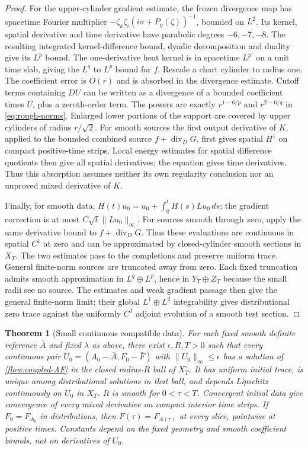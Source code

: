 \documentclass[11pt]{article}
\numberwithin{equation}{section}
\newtheorem{theorem}{Theorem}[section]
\theoremstyle{definition}
\theoremstyle{remark}
\begin{document}
\begin{proof}
For the upper-cylinder gradient estimate, the frozen divergence
map has spacetime Fourier multiplier
$-\zeta_k\zeta_i(i\sigma+P_y(\zeta))^{-1}$, bounded on $L^2$.
Its kernel, spatial derivative and time derivative have parabolic
degrees $-6,-7,-8$. The resulting integrated kernel-difference
bound, dyadic decomposition and duality give its $L^p$ bound.
The one-derivative heat kernel is in spacetime $L^{p'}$
on a unit time slab, giving the $L^q$ to $L^p$ bound for $f$.
Rescale a chart cylinder to radius one. The coefficient error
is $O(r)$ and is absorbed in the divergence estimate.
Cutoff terms containing $DU$ can be written as a divergence
of a bounded coefficient times $U$, plus a zeroth-order term.
The powers are exactly $r^{1-6/p}$ and $r^{2-6/q}$ in
\eqref{eq:rough-norms}. Enlarged lower portions of the support
are covered by upper cylinders of radius $r/\sqrt2$.
For smooth sources the first output derivative of $K$, applied
to the bounded combined source $f+\operatorname{div}_DG$,
first gives spatial $H^1$ on compact positive-time strips.
Local energy estimates for spatial difference quotients then
give all spatial derivatives; the equation gives time derivatives.
Thus this absorption assumes neither its own regularity
conclusion nor an unproved mixed derivative of $K$.

Finally, for smooth data,
$H(t)u_0=u_0+\int_0^tH(s)Lu_0\,ds$; the gradient correction
is at most $C\sqrt t\|Lu_0\|_\infty$.
For sources smooth through zero, apply the same derivative
bound to $f+\operatorname{div}_DG$. Thus these evaluations
are continuous in spatial $C^1$ at zero and can be approximated
by closed-cylinder smooth sections in $X_T$.
The two estimates pass to the completions and preserve uniform
trace. General finite-norm sources are truncated away from zero.
Each fixed truncation admits smooth approximation in
$L^q\oplus L^p$, hence in $Y_T\oplus Z_T$ because the small
radii see no source. The estimates and weak gradient passage
then give the general finite-norm limit;
their global $L^1\oplus L^2$ integrability gives distributional
zero trace against the uniformly $C^1$ adjoint evolution of a
smooth test section.
\end{proof}

\begin{theorem}[Small continuous compatible data]\label{thm:rough-local}
For each fixed smooth definite reference $\bar A$ and fixed
$\lambda$ as above, there exist $\epsilon,R,T>0$ such that
every continuous pair $U_0=(A_0-\bar A,F_0-\bar F)$ with
$\|U_0\|_\infty\le\epsilon$ has a solution of
\eqref{flow:coupled-AF} in the closed radius-$R$ ball of
$X_T^\circ$. It has uniform initial trace, is unique among
distributional solutions in that ball, and depends Lipschitz
continuously on $U_0$ in $X_T$.
It is smooth for $0<\tau<T$. Convergent initial data give
convergence of every mixed derivative on compact interior
time strips. If $F_0=F_{A_0}$ in distributions, then
$F(\tau)=F_{A(\tau)}$ at every slice, pointwise at positive
times. Constants depend on the fixed geometry and smooth
coefficient bounds, not on derivatives of $U_0$.
\end{theorem}
\end{document}
